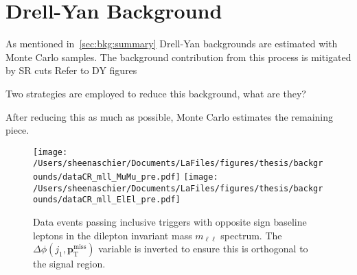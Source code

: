 \section{Drell-Yan Background}
\label{sec:bkg:dy}
As mentioned in~\ref{sec:bkg:summary} Drell-Yan backgrounds are estimated with Monte Carlo samples.  The background contribution from this process is mitigated by SR cuts
Refer to DY figures

Two strategies are employed to reduce this background, what are they?

After reducing this as much as possible, Monte Carlo estimates the remaining piece.

 \begin{figure}
 \centering
    \texttt{[image: /Users/sheenaschier/Documents/LaFiles/figures/thesis/backgrounds/dataCR\_mll\_MuMu\_pre.pdf]}
 \texttt{[image: /Users/sheenaschier/Documents/LaFiles/figures/thesis/backgrounds/dataCR\_mll\_ElEl\_pre.pdf]}
  \caption{Data events passing inclusive \met{} triggers with opposite sign baseline leptons in the dilepton invariant mass $m_{\ell\ell}$ spectrum. The $\Delta\phi(j_1, \mathbf{p}_\mathrm{    T}^\mathrm{miss})$ variable is inverted to ensure this is orthogonal to the signal region.}
  \label{fig:mll_data}
 \end{figure}
\FloatBarrier




